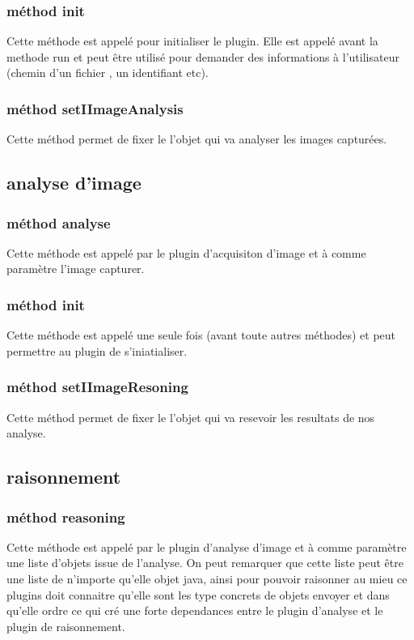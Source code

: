 \documentclass[a4paper , 12pt]{article}
\begin{document}
  \subsubsection*{méthod init}
  Cette méthode est appelé pour initialiser le plugin. Elle est appelé avant la methode run et peut être utilisé pour demander des informations à l'utilisateur (chemin d'un fichier , un identifiant etc).
  \subsubsection*{méthod setIImageAnalysis}
  Cette méthod permet de fixer le l'objet qui va analyser les images capturées.
  \subsection{analyse d'image}
 
  \subsubsection*{méthod analyse}
  Cette méthode est appelé par le plugin d'acquisiton d'image et à comme paramètre l'image capturer.
  \subsubsection*{méthod init}
  Cette méthode est appelé une seule fois (avant toute autres méthodes) et peut permettre au plugin de s'iniatialiser.
  \subsubsection*{méthod setIImageResoning}
  Cette méthod permet de fixer le l'objet qui va resevoir les resultats de nos analyse.

  \subsection{raisonnement}
 
  \subsubsection*{méthod reasoning}
  Cette méthode est appelé par le plugin d'analyse d'image et à comme paramètre une liste d'objets issue de l'analyse.
  On peut remarquer que cette liste peut être une liste de n'importe qu'elle objet java, ainsi pour pouvoir raisonner au mieu ce plugins doit connaitre qu'elle sont les type concrets de objets envoyer et dans qu'elle ordre ce qui cré une forte dependances entre le plugin d'analyse et le plugin de raisonnement.
\end{document}
